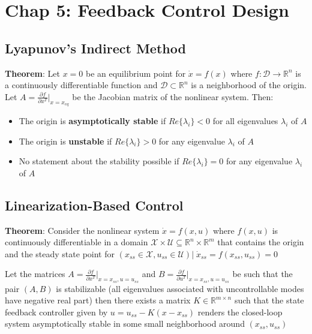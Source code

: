 \section{Chap 5: Feedback Control Design}
\subsection{Lyapunov's Indirect Method}
\textbf{Theorem}: Let $x=0$ be an equilibrium point for $\Dot{x} = f(x)$ where $f:\mathcal{D} \to \mathbb{R}^n$ is a continuously differentiable function and $\mathcal{D} \subset \mathbb{R}^n$ is a neighborhood of the origin. Let $A = \frac{\partial f}{\partial x^T}|_{x = x_{eq}}$ be the Jacobian matrix of the nonlinear system. Then:
\begin{itemize}
    \item The origin is \textbf{asymptotically stable} if $Re\{ \lambda_i \} < 0$ for all eigenvalues $\lambda_i$ of $A$
    \item The origin is \textbf{unstable} if $Re\{ \lambda_i \} > 0$ for any eigenvalue $\lambda_i$ of $A$
    \item No statement about the stability possible if $Re\{ \lambda_i \} = 0$ for any eigenvalue $\lambda_i$ of $A$
\end{itemize}
\subsection{Linearization-Based Control}
\textbf{Theorem}: Consider the nonlinear system $\Dot{x} = f(x,u)$ where $f(x,u)$ is continuously differentiable in a domain $\mathcal{X} \times \mathcal{U} \subseteq \mathbb{R}^n \times \mathbb{R}^m$ that contains the origin and the steady state point for $(x_{ss}\in \mathcal{X},u_{ss}\in \mathcal{U}) | \; \Dot{x}_{ss}=f(x_{ss},u_{ss}) = 0$

Let the matrices $A=\frac{\partial f}{\partial x^T}|_{x=x_{ss},u=u_{ss}}$ and $B=\frac{\partial f}{\partial u^T}|_{x=x_{ss},u=u_{ss}}$ be such that the pair $(A,B)$ is stabilizable (all eigenvalues associated with uncontrollable modes have negative real part) then there exists a matrix $K \in \mathbb{R}^{m\times n}$ such that the state feedback controller given by $u = u_{ss} - K(x-x_{ss})$ renders the closed-loop system asymptotically stable in some small neighborhood around $(x_{ss},u_{ss})$

